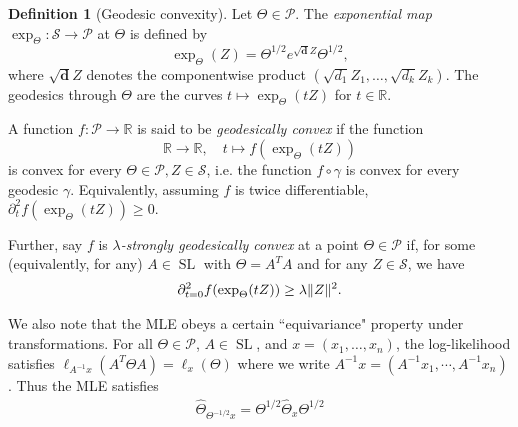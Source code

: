 \documentclass[aos]{imsart}
\theoremstyle{definition}
\newtheorem{definition}{Definition}
\DeclareMathOperator{\tr}{Tr}
\DeclarePairedDelimiter{\norm}{\lVert}{\rVert}
\newcommand{\R}{{\mathbb{R}}}
\renewcommand{\vec}{\bm}
\newcommand{\SL}{\operatorname{SL}}
\newcommand{\Sym}{\mathcal{S}}
\newcommand{\SPD}{\mathcal{P}}
\newcommand{\samp}{x}
\newcommand{\CF}[1]{{\color{purple}[CF: #1]}}
\begin{document}
\begin{definition}[Geodesic convexity]\label{dfn:g-convexity}
 Let $\Theta \in \SPD$. The \emph{exponential map} $\exp_\Theta:\Sym \to \SPD$ at $\Theta$ is defined by
$$ \exp_\Theta(Z) = \Theta^{1/2} e^{\sqrt{\vec d}Z} \Theta^{1/2},$$
where $\sqrt{\vec d} Z$ denotes the componentwise product $(\sqrt{d_1} Z_1, \dots, \sqrt{d_k}Z_k)$.
The geodesics through $\Theta$ are the curves $t\mapsto \exp_\Theta(tZ)$ for $t \in \R$.


A function $f\colon \SPD \to \R$ is said to be \emph{geodesically convex} if the function
$$\R \to \R, \quad t \mapsto f (\exp_\Theta( tZ))$$ is convex for every $\Theta \in \SPD, Z \in \Sym$, i.e. the function $f \circ \gamma$ is convex for every geodesic $\gamma$. Equivalently, assuming $f$ is twice differentiable, $\partial^2_t f(\exp_\Theta(tZ)) \geq 0.$

Further, say $f$ is \emph{$\lambda$-strongly geodesically convex} at a point $\Theta \in \SPD$ if, for some (equivalently, for any) $A \in \SL$ with $\Theta = A^T A$ and for any $Z \in \Sym$, we have
\begin{align*}
  \partial^2_{t=0} f(\exp_\Theta(tZ)) \geq \lambda \norm{Z}^2.
\end{align*}
\end{definition}
We also note that the MLE obeys a certain ``equivariance" property under transformations. For all $\Theta \in \SPD$, $A \in \SL$, and $\samp=(\samp_1,\dots,\samp_n)$, the log-likelihood satisfies $\ell_{A^{-1} \samp}(A^T \Theta A) = \ell_{\samp}(\Theta)$ where we write $A^{-1} \samp = (A^{-1} \samp_1,\cdots,A^{-1} \samp_n)$.  Thus the MLE satisfies
\begin{align}\label{eq:equivariance}
\widehat\Theta_{\Theta^{-1/2} \samp} = \Theta^{1/2} \widehat\Theta_{\samp} \Theta^{1/2}\end{align}
\end{document}
